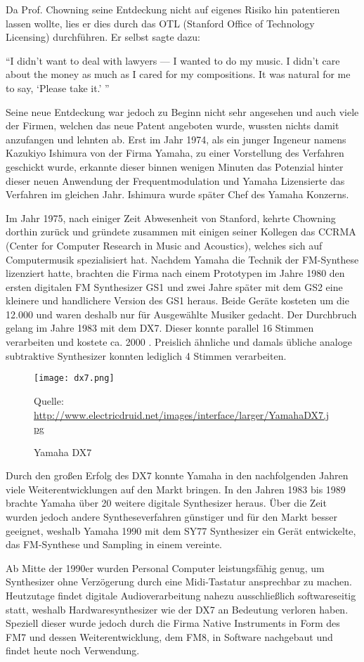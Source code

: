 Da Prof. Chowning seine Entdeckung nicht auf eigenes Risiko hin patentieren lassen wollte, lies er dies durch das OTL (Stanford Office of Technology Licensing) durchführen. Er selbst sagte dazu:

``I didn’t want to deal with lawyers — I wanted to do my music. I didn’t care about the money as much as I cared for my compositions. It was natural for me to say, `Please take it.' ''

 Seine neue Entdeckung war jedoch zu Beginn nicht sehr angesehen und auch viele der Firmen, welchen das neue Patent angeboten wurde, wussten nichts damit anzufangen und lehnten ab. Erst im Jahr 1974, als ein junger Ingeneur namens Kazukiyo Ishimura von der Firma Yamaha, zu einer Vorstellung des Verfahren geschickt wurde, erkannte dieser binnen wenigen Minuten das Potenzial hinter dieser neuen Anwendung der Frequentmodulation und Yamaha Lizensierte das Verfahren im gleichen Jahr. Ishimura wurde später Chef des Yamaha Konzerns. 

Im Jahr 1975, nach einiger Zeit Abwesenheit von Stanford, kehrte Chowning dorthin zurück und gründete zusammen mit einigen seiner Kollegen das CCRMA (Center for Computer Research in Music and Acoustics), welches sich auf Computermusik spezialisiert hat.
Nachdem Yamaha die Technik der FM-Synthese lizenziert hatte, brachten die Firma nach einem Prototypen im Jahre 1980 den ersten digitalen FM Synthesizer GS1 und zwei Jahre später mit dem GS2 eine kleinere und handlichere Version des GS1 heraus. Beide Geräte kosteten um die 12.000 \textdollar und waren deshalb nur für Ausgewählte Musiker gedacht. Der Durchbruch gelang im Jahre 1983 mit dem DX7. Dieser konnte parallel 16 Stimmen verarbeiten und kostete ca. 2000 \textdollar. Preislich ähnliche und damals übliche analoge subtraktive Synthesizer konnten lediglich 4 Stimmen verarbeiten.

 \begin{figure} [ht]
\centering
  \texttt{[image: dx7.png]}
\caption{Yamaha DX7}
Quelle: \url{http://www.electricdruid.net/images/interface/larger/YamahaDX7.jpg}
\end{figure}

Durch den großen Erfolg des DX7 konnte Yamaha in den nachfolgenden Jahren viele Weiterentwicklungen auf den Markt bringen. In den Jahren 1983 bis 1989 brachte Yamaha über 20 weitere digitale Synthesizer heraus. Über die Zeit wurden jedoch andere Syntheseverfahren günstiger und für den Markt besser geeignet, weshalb Yamaha 1990 mit dem SY77 Synthesizer ein Gerät entwickelte, das FM-Synthese und Sampling in einem vereinte. 

Ab Mitte der 1990er wurden Personal Computer leistungsfähig genug, um Synthesizer ohne Verzögerung durch eine Midi-Tastatur ansprechbar zu machen. Heutzutage findet digitale Audioverarbeitung nahezu ausschließlich softwareseitig statt, weshalb Hardwaresynthesizer wie der DX7 an Bedeutung verloren haben. Speziell dieser wurde jedoch durch die Firma Native Instruments in Form des FM7 und dessen Weiterentwicklung, dem FM8, in Software nachgebaut und findet heute noch Verwendung.

